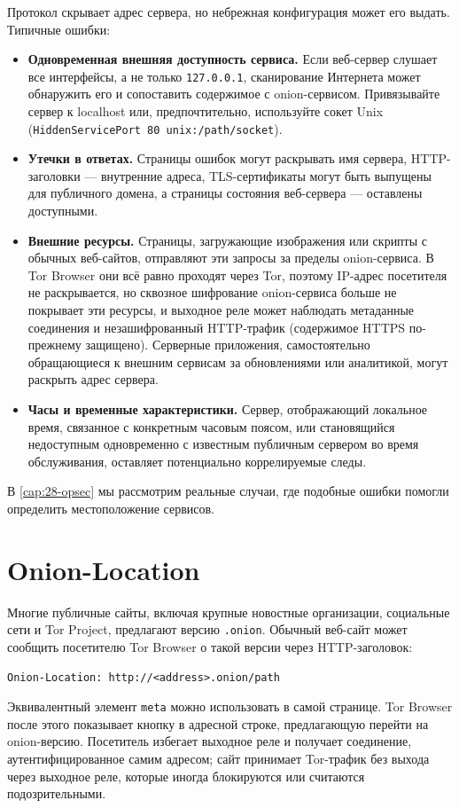 Протокол скрывает адрес сервера, но небрежная конфигурация может его выдать. Типичные ошибки:
\begin{itemize}
  \item \textbf{Одновременная внешняя доступность сервиса.} Если веб-сервер слушает все интерфейсы, а не только \texttt{127.0.0.1}, сканирование Интернета может обнаружить его и сопоставить содержимое с onion-сервисом. Привязывайте сервер к localhost или, предпочтительно, используйте сокет Unix (\texttt{HiddenServicePort 80 unix:/path/socket}).
  \item \textbf{Утечки в ответах.} Страницы ошибок могут раскрывать имя сервера, HTTP-заголовки — внутренние адреса, TLS-сертификаты могут быть выпущены для публичного домена, а страницы состояния веб-сервера — оставлены доступными.
  \item \textbf{Внешние ресурсы.} Страницы, загружающие изображения или скрипты с обычных веб-сайтов, отправляют эти запросы за пределы onion-сервиса. В Tor Browser они всё равно проходят через Tor, поэтому IP-адрес посетителя не раскрывается, но сквозное шифрование onion-сервиса больше не покрывает эти ресурсы, и выходное реле может наблюдать метаданные соединения и незашифрованный HTTP-трафик (содержимое HTTPS по-прежнему защищено). Серверные приложения, самостоятельно обращающиеся к внешним сервисам за обновлениями или аналитикой, могут раскрыть адрес сервера.
  \item \textbf{Часы и временные характеристики.} Сервер, отображающий локальное время, связанное с конкретным часовым поясом, или становящийся недоступным одновременно с известным публичным сервером во время обслуживания, оставляет потенциально коррелируемые следы.
\end{itemize}
В \cref{cap:28-opsec} мы рассмотрим реальные случаи, где подобные ошибки помогли определить местоположение сервисов.

\section{Onion-Location}\label{sec:onionp-location}

Многие публичные сайты, включая крупные новостные организации, социальные сети и Tor Project, предлагают версию \texttt{.onion}. Обычный веб-сайт может сообщить посетителю Tor Browser о такой версии через HTTP-заголовок:
\begin{lstlisting}[numbers=none]
Onion-Location: http://<address>.onion/path
\end{lstlisting}
Эквивалентный элемент \texttt{meta} можно использовать в самой странице. Tor Browser после этого показывает кнопку в адресной строке, предлагающую перейти на onion-версию. Посетитель избегает выходное реле и получает соединение, аутентифицированное самим адресом; сайт принимает Tor-трафик без выхода через выходное реле, которые иногда блокируются или считаются подозрительными.

